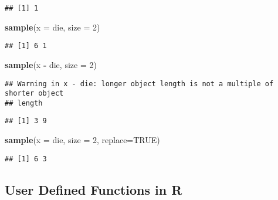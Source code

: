 \documentclass[
]{article}
\newenvironment{Shaded}{\begin{snugshade}}{\end{snugshade}}
\newcommand{\AttributeTok}[1]{\textcolor[rgb]{0.13,0.29,0.53}{#1}}
\newcommand{\ConstantTok}[1]{\textcolor[rgb]{0.56,0.35,0.01}{#1}}
\newcommand{\DecValTok}[1]{\textcolor[rgb]{0.00,0.00,0.81}{#1}}
\newcommand{\FunctionTok}[1]{\textcolor[rgb]{0.13,0.29,0.53}{\textbf{#1}}}
\newcommand{\NormalTok}[1]{#1}
\newcommand{\SpecialCharTok}[1]{\textcolor[rgb]{0.81,0.36,0.00}{\textbf{#1}}}
\begin{document}
\begin{verbatim}
## [1] 1
\end{verbatim}

\begin{Shaded}
\begin{Highlighting}[]
\FunctionTok{sample}\NormalTok{(}\AttributeTok{x =}\NormalTok{ die, }\AttributeTok{size =} \DecValTok{2}\NormalTok{)}
\end{Highlighting}
\end{Shaded}

\begin{verbatim}
## [1] 6 1
\end{verbatim}

\begin{Shaded}
\begin{Highlighting}[]
\FunctionTok{sample}\NormalTok{(x }\SpecialCharTok{{-}}\NormalTok{ die, }\AttributeTok{size =} \DecValTok{2}\NormalTok{)}
\end{Highlighting}
\end{Shaded}

\begin{verbatim}
## Warning in x - die: longer object length is not a multiple of shorter object
## length
\end{verbatim}

\begin{verbatim}
## [1] 3 9
\end{verbatim}

\begin{Shaded}
\begin{Highlighting}[]
\FunctionTok{sample}\NormalTok{(}\AttributeTok{x =}\NormalTok{ die, }\AttributeTok{size =} \DecValTok{2}\NormalTok{, }\AttributeTok{replace=}\ConstantTok{TRUE}\NormalTok{)}
\end{Highlighting}
\end{Shaded}

\begin{verbatim}
## [1] 6 3
\end{verbatim}

\subsection{User Defined Functions in
R}\label{user-defined-functions-in-r}
\end{document}
